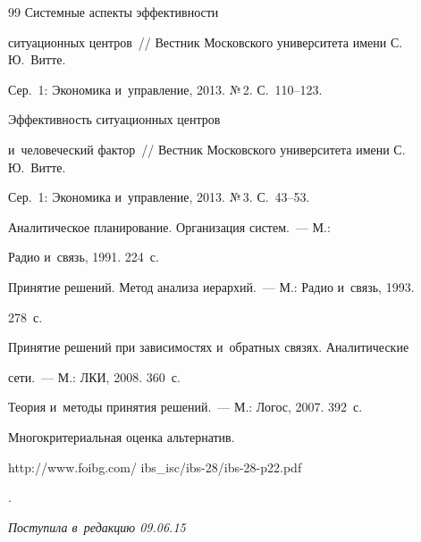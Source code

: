 {{\begin{thebibliography}{99}
 Системные аспекты эффективности 

ситуационных центров~/\!\!/ Вестник Московского университета имени С.\,Ю.~Витте. 

Сер.~1: Экономика и~управление, 2013. №\,2. С.~110--123.


 Эффективность ситуационных центров 

и~человеческий фактор~/\!\!/ Вестник Московского университета имени С.\,Ю.~Витте. 

Сер.~1: Экономика и~управление, 2013. №\,3. С.~43--53.


 Аналитическое планирование. Организация систем.~--- М.: 

Радио и~связь, 1991. 224~с.


 Принятие решений. Метод анализа иерархий.~--- М.: Радио и~связь, 1993. 

278~с.


 Принятие решений при зависимостях и~обратных связях. Аналитические 

сети.~--- М.: ЛКИ, 2008. 360~с.


 Теория и~методы принятия решений.~--- М.: Логос, 2007. 392~с.


 Многокритериальная оценка альтернатив. {\sf 

http://www.foibg.com/ ibs\_isc/ibs-28/ibs-28-p22.pdf}.

   \end{thebibliography}

} }





\vspace*{-3pt}



\hfill{\small\textit{Поступила в~редакцию 09.06.15}}












